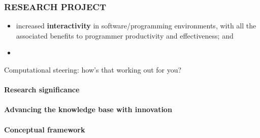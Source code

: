 \documentclass[a4paper]{scrartcl}
\begin{document}



\subsubsection*{RESEARCH PROJECT}

\parencite{Mattoso}

\begin{itemize}
\item increased \textbf{interactivity} in software/programming
  environments, with all the associated benefits to programmer
  productivity and effectiveness; and
\item 
\end{itemize}

Computational steering: how's that working out for you?


\paragraph{Research significance}


\paragraph{Advancing the knowledge base with innovation}


\paragraph{Conceptual framework}

\end{document}
